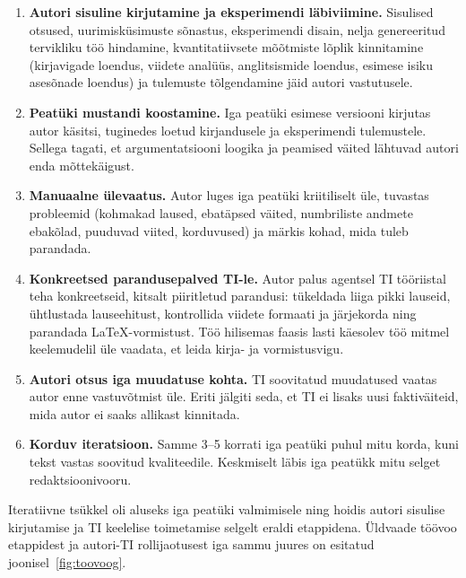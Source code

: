 \begin{enumerate}
    \item \textbf{Autori sisuline kirjutamine ja eksperimendi läbiviimine.} Sisulised otsused, uurimisküsimuste sõnastus, eksperimendi disain, nelja genereeritud tervikliku töö hindamine, kvantitatiivsete mõõtmiste lõplik kinnitamine (kirjavigade loendus, viidete analüüs, anglitsismide loendus, esimese isiku asesõnade loendus) ja tulemuste tõlgendamine jäid autori vastutusele.
    \item \textbf{Peatüki mustandi koostamine.} Iga peatüki esimese versiooni kirjutas autor käsitsi, tuginedes loetud kirjandusele ja eksperimendi tulemustele. Sellega tagati, et argumentatsiooni loogika ja peamised väited lähtuvad autori enda mõttekäigust.
    \item \textbf{Manuaalne ülevaatus.} Autor luges iga peatüki kriitiliselt üle, tuvastas probleemid (kohmakad laused, ebatäpsed väited, numbriliste andmete ebakõlad, puuduvad viited, korduvused) ja märkis kohad, mida tuleb parandada.
    \item \textbf{Konkreetsed parandusepalved TI-le.} Autor palus agentsel TI tööriistal teha konkreetseid, kitsalt piiritletud parandusi: tükeldada liiga pikki lauseid, ühtlustada lauseehitust, kontrollida viidete formaati ja järjekorda ning parandada \LaTeX{}-vormistust. Töö hilisemas faasis lasti käesolev töö mitmel keelemudelil üle vaadata, et leida kirja- ja vormistusvigu.
    \item \textbf{Autori otsus iga muudatuse kohta.} TI soovitatud muudatused vaatas autor enne vastuvõtmist üle. Eriti jälgiti seda, et TI ei lisaks uusi faktiväiteid, mida autor ei saaks allikast kinnitada.
    \item \textbf{Korduv iteratsioon.} Samme 3--5 korrati iga peatüki puhul mitu korda, kuni tekst vastas soovitud kvaliteedile. Keskmiselt läbis iga peatükk mitu selget redaktsioonivooru.
\end{enumerate}

Iteratiivne tsükkel oli aluseks iga peatüki valmimisele ning hoidis autori sisulise kirjutamise ja TI keelelise toimetamise selgelt eraldi etappidena. Üldvaade töövoo etappidest ja autori-TI rollijaotusest iga sammu juures on esitatud joonisel~\ref{fig:toovoog}.

